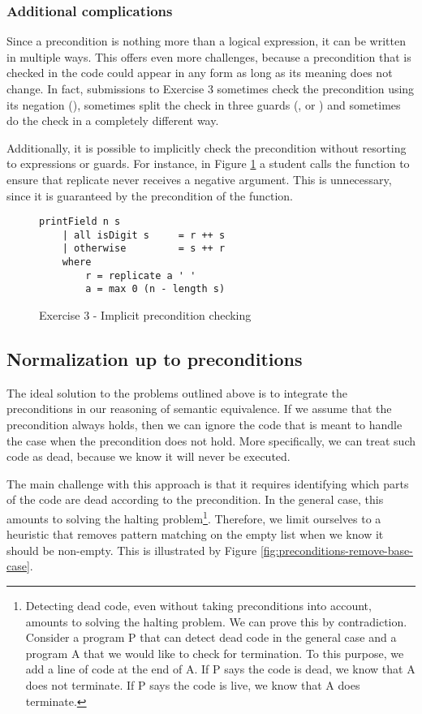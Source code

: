 \subsubsection{Additional complications}

Since a precondition is nothing more than a logical expression, it can be written in multiple ways. This offers even more challenges, because a precondition that is checked in the code could appear in any form as long as its meaning does not change. In fact, submissions to Exercise 3 sometimes check the precondition using its negation (), sometimes split the check in three guards (,  or ) and sometimes do the check in a completely different way.

Additionally, it is possible to implicitly check the precondition without resorting to  expressions or guards. For instance, in Figure \ref{fig:ex3-implicit-precondition-checking} a student calls the  function to ensure that replicate never receives a negative argument. This is unnecessary, since it is guaranteed by the precondition of the function.

\begin{figure}
\centering
\begin{verbatim}
printField n s
    | all isDigit s     = r ++ s
    | otherwise         = s ++ r
    where
        r = replicate a ' '
        a = max 0 (n - length s)
\end{verbatim}
\caption{Exercise 3 - Implicit precondition checking}
\label{fig:ex3-implicit-precondition-checking}
\end{figure}

\subsection{Normalization up to preconditions}
\label{sec:analysis-precondition-solution}

The ideal solution to the problems outlined above is to integrate the preconditions in our reasoning of semantic equivalence. If we assume that the precondition always holds, then we can ignore the code that is meant to handle the case when the precondition does not hold. More specifically, we can treat such code as dead, because we know it will never be executed.

The main challenge with this approach is that it requires identifying which parts of the code are dead according to the precondition. In the general case, this amounts to solving the halting problem\footnote{Detecting dead code, even without taking preconditions into account, amounts to solving the halting problem. We can prove this by contradiction. Consider a program P that can detect dead code in the general case and a program A that we would like to check for termination. To this purpose, we add a line of code at the end of A. If P says the code is dead, we know that A does not terminate. If P says the code is live, we know that A does terminate.}. Therefore, we limit ourselves to a heuristic that removes pattern matching on the empty list when we know it should be non-empty. This is illustrated by Figure \ref{fig:preconditions-remove-base-case}.

